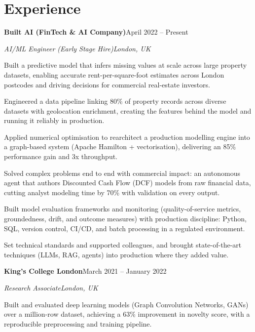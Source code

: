 \documentclass[10pt,a4paper]{article}
\newcommand{\entry}[4]{%
  {\color{company}\bfseries #1}\hfill {\color{muted}#2}\par
  \vspace{1pt}
  {\itshape #3}\hfill {\color{muted}\itshape #4}\par
  \vspace{3pt}%
}
\begin{document}
\section{Experience}
\entry{Built AI (FinTech \& AI Company)}{April 2022 -- Present}{AI/ML Engineer (Early Stage Hire)}{London, UK}
\begin{tight}
  \item Built a predictive model that infers missing values at scale across large property datasets, enabling accurate rent-per-square-foot estimates across London postcodes and driving decisions for commercial real-estate investors.
  \item Engineered a data pipeline linking 80\% of property records across diverse datasets with geolocation enrichment, creating the features behind the model and running it reliably in production.
  \item Applied numerical optimisation to rearchitect a production modelling engine into a graph-based system (Apache Hamilton + vectorisation), delivering an 85\% performance gain and 3x throughput.
  \item Solved complex problems end to end with commercial impact: an autonomous agent that authors Discounted Cash Flow (DCF) models from raw financial data, cutting analyst modeling time by 70\% with validation on every output.
  \item Built model evaluation frameworks and monitoring (quality-of-service metrics, groundedness, drift, and outcome measures) with production discipline: Python, SQL, version control, CI/CD, and batch processing in a regulated environment.
  \item Set technical standards and supported colleagues, and brought state-of-the-art techniques (LLMs, RAG, agents) into production where they added value.
\end{tight}

\entry{King's College London}{March 2021 -- January 2022}{Research Associate}{London, UK}
\begin{tight}
  \item Built and evaluated deep learning models (Graph Convolution Networks, GANs) over a million-row dataset, achieving a 63\% improvement in novelty score, with a reproducible preprocessing and training pipeline.
\end{tight}

\end{document}
